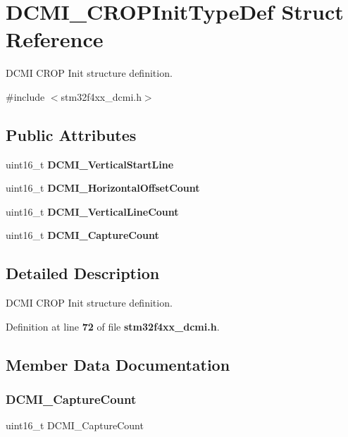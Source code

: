 \section{D\+C\+M\+I\+\_\+\+C\+R\+O\+P\+Init\+Type\+Def Struct Reference}
\label{structDCMI__CROPInitTypeDef}


D\+C\+MI C\+R\+OP Init structure definition.  




{\ttfamily \#include $<$stm32f4xx\+\_\+dcmi.\+h$>$}

\subsection*{Public Attributes}
\begin{DoxyCompactItemize}
\item 
uint16\+\_\+t \textbf{ D\+C\+M\+I\+\_\+\+Vertical\+Start\+Line}
\item 
uint16\+\_\+t \textbf{ D\+C\+M\+I\+\_\+\+Horizontal\+Offset\+Count}
\item 
uint16\+\_\+t \textbf{ D\+C\+M\+I\+\_\+\+Vertical\+Line\+Count}
\item 
uint16\+\_\+t \textbf{ D\+C\+M\+I\+\_\+\+Capture\+Count}
\end{DoxyCompactItemize}


\subsection{Detailed Description}
D\+C\+MI C\+R\+OP Init structure definition. 

Definition at line \textbf{ 72} of file \textbf{ stm32f4xx\+\_\+dcmi.\+h}.



\subsection{Member Data Documentation}
\mbox{\label{structDCMI__CROPInitTypeDef_a7fe2fa515bf8d3fa989fedf6e4bd39e0}} 
\subsubsection{D\+C\+M\+I\+\_\+\+Capture\+Count}
{\footnotesize\ttfamily uint16\+\_\+t D\+C\+M\+I\+\_\+\+Capture\+Count}

